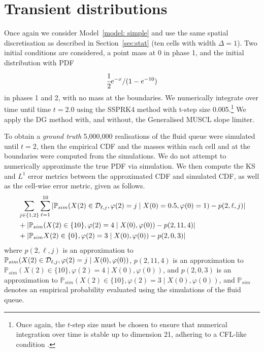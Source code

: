 \section{Transient distributions}\label{sec: transient approx}
Once again we consider Model~\ref{model: simple} and use the same spatial discretisation as described in Section~\ref{sec:stat} (ten cells with width \(\Delta=1\)). Two initial conditions are considered, a point mass at 0 in phase 1, and the initial distribution with PDF 
\begin{align}
	\cfrac{1}{2}e^{-x}/(1-e^{-10})\label{eqn: exp init cond}
\end{align}
in phases 1 and 2, with no mass at the boundaries. We numerically integrate over time until time \(t=2.0\) using the SSPRK4 method with t-step size 0.005.\footnote{Once again, the \(t\)-step size must be chosen to ensure that numerical integration over time is stable up to dimension 21, adhering to a CFL-like condition \cite[Section~4.8]{nodalDGBook}.} We apply the DG method with, and without, the Generalised MUSCL slope limiter. 

To obtain a \emph{ground truth} 5,000,000 realisations of the fluid queue were simulated until \(t=2\), then the empirical CDF and the masses within each cell and at the boundaries were computed from the simulations. We do not attempt to numerically approximate the true PDF via simulation. We then compute the KS and \(L^1\) error metrics between the approximated CDF and simulated CDF, as well as the cell-wise error metric, given as follows. 
\begin{align}
	&\sum_{j\in\{1,2\}}\sum_{\ell=1}^{10} \left|\mathbb P_{sim}(X(2)\in\mathcal{D}_{\ell,j}, \varphi(2)=j\mid X(0)=0.5,\varphi(0)=1)-p(2,\ell,j)\right|\nonumber 
	\\&+\left|\mathbb P_{sim}(X(2)\in\{10\}, \varphi(2)=4\mid X(0),\varphi(0))-p(2,11,4)\right|\nonumber 
	\\&+\left|\mathbb P_{sim}X(2)\in\{0\}, \varphi(2)=3\mid X(0),\varphi(0))-p(2,0,3)\right| \label{eqn: cell errors 2}
\end{align}
where \(p(2,\ell,j)\) is an approximation to \(\mathbb P_{sim}(X(2)\in\mathcal{D}_{\ell,j}, \varphi(2)=j\mid X(0),\varphi(0))\), \(p(2,11,4)\) is an approximation to \(\mathbb P_{sim}(X(2)\in\{10\}, \varphi(2)=4\mid X(0),\varphi(0))\), and \(p(2,0,3)\) is an approximation to \(\mathbb P_{sim}(X(2)\in\{10\}, \varphi(2)=3\mid X(0),\varphi(0))\), and \(\mathbb P_{sim}\) denotes an empirical probability evaluated using the simulations of the fluid queue. 

